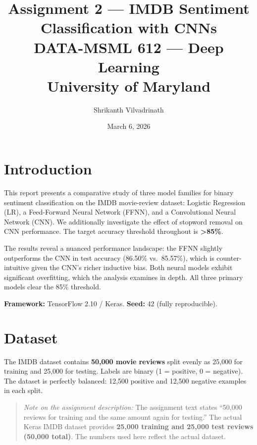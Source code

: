 \documentclass[12pt,a4paper]{article}
\title{%
  \textbf{Assignment 2 --- IMDB Sentiment Classification with CNNs}\\[6pt]
  \large DATA-MSML 612 --- Deep Learning\\
  University of Maryland
}
\author{Shrikanth Vilvadrinath}
\date{March 6, 2026}
\begin{document}
\maketitle
\tableofcontents
\newpage

\section{Introduction}

This report presents a comparative study of three model families for binary sentiment
classification on the IMDB movie-review dataset: Logistic Regression (LR), a Feed-Forward
Neural Network (FFNN), and a Convolutional Neural Network (CNN). We additionally
investigate the effect of stopword removal on CNN performance. The target accuracy
threshold throughout is \textbf{>85\%}.

The results reveal a nuanced performance landscape: the FFNN slightly outperforms the CNN
in test accuracy (86.50\% vs.\ 85.57\%), which is counter-intuitive given the CNN's richer
inductive bias. Both neural models exhibit significant overfitting, which the analysis
examines in depth. All three primary models clear the 85\% threshold.

\textbf{Framework:} TensorFlow 2.10 / Keras. \textbf{Seed:} 42 (fully reproducible).

\section{Dataset}

The IMDB dataset \cite{maas2011} contains \textbf{50,000 movie reviews} split evenly as
25,000 for training and 25,000 for testing. Labels are binary (1 = positive, 0 = negative).
The dataset is perfectly balanced: 12,500 positive and 12,500 negative examples in each
split.

\begin{quote}
\textit{Note on the assignment description:} The assignment text states ``50,000 reviews
for training and the same amount again for testing.'' The actual Keras IMDB dataset
provides \textbf{25,000 training and 25,000 test reviews (50,000 total)}. The numbers
used here reflect the actual dataset.
\end{quote}
\end{document}
